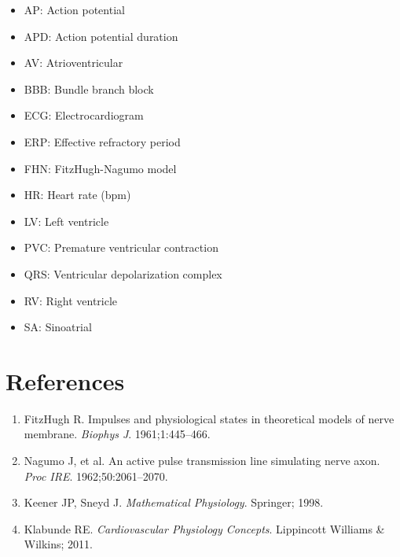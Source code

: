 \documentclass[12pt,oneside,a4paper]{book}
\begin{document}
\begin{itemize}
  \item AP: Action potential
  \item APD: Action potential duration
  \item AV: Atrioventricular
  \item BBB: Bundle branch block
  \item ECG: Electrocardiogram
  \item ERP: Effective refractory period
  \item FHN: FitzHugh-Nagumo model
  \item HR: Heart rate (bpm)
  \item LV: Left ventricle
  \item PVC: Premature ventricular contraction
  \item QRS: Ventricular depolarization complex
  \item RV: Right ventricle
  \item SA: Sinoatrial
\end{itemize}

\section{References}

\begin{enumerate}
  \item FitzHugh R. Impulses and physiological states in theoretical models of nerve membrane. \textit{Biophys J}. 1961;1:445--466.
  
  \item Nagumo J, et al. An active pulse transmission line simulating nerve axon. \textit{Proc IRE}. 1962;50:2061--2070.
  
  \item Keener JP, Sneyd J. \textit{Mathematical Physiology}. Springer; 1998.
  
  \item Klabunde RE. \textit{Cardiovascular Physiology Concepts}. Lippincott Williams \& Wilkins; 2011.
\end{enumerate}
\end{document}
